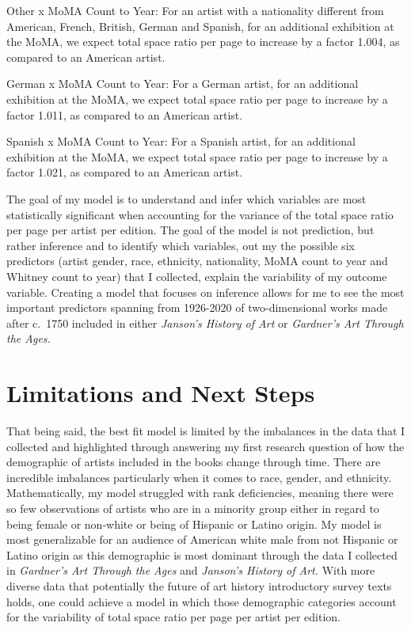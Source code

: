 \documentclass[
  letterpaper,
  DIV=11,
  numbers=noendperiod]{scrreprt}
\begin{document}
Other x MoMA Count to Year: For an artist with a nationality different
from American, French, British, German and Spanish, for an additional
exhibition at the MoMA, we expect total space ratio per page to increase
by a factor 1.004, as compared to an American artist.

German x MoMA Count to Year: For a German artist, for an additional
exhibition at the MoMA, we expect total space ratio per page to increase
by a factor 1.011, as compared to an American artist.

Spanish x MoMA Count to Year: For a Spanish artist, for an additional
exhibition at the MoMA, we expect total space ratio per page to increase
by a factor 1.021, as compared to an American artist.

The goal of my model is to understand and infer which variables are most
statistically significant when accounting for the variance of the total
space ratio per page per artist per edition. The goal of the model is
not prediction, but rather inference and to identify which variables,
out my the possible six predictors (artist gender, race, ethnicity,
nationality, MoMA count to year and Whitney count to year) that I
collected, explain the variability of my outcome variable. Creating a
model that focuses on inference allows for me to see the most important
predictors spanning from 1926-2020 of two-dimensional works made after
c.~1750 included in either \emph{Janson's History of Art} or
\emph{Gardner's Art Through the Ages.}

\hypertarget{limitations-and-next-steps}{%
\section{Limitations and Next Steps}\label{limitations-and-next-steps}}

That being said, the best fit model is limited by the imbalances in the
data that I collected and highlighted through answering my first
research question of how the demographic of artists included in the
books change through time. There are incredible imbalances particularly
when it comes to race, gender, and ethnicity. Mathematically, my model
struggled with rank deficiencies, meaning there were so few observations
of artists who are in a minority group either in regard to being female
or non-white or being of Hispanic or Latino origin. My model is most
generalizable for an audience of American white male from not Hispanic
or Latino origin as this demographic is most dominant through the data I
collected in \emph{Gardner's Art Through the Ages} and \emph{Janson's
History of Art.} With more diverse data that potentially the future of
art history introductory survey texts holds, one could achieve a model
in which those demographic categories account for the variability of
total space ratio per page per artist per edition.
\end{document}
